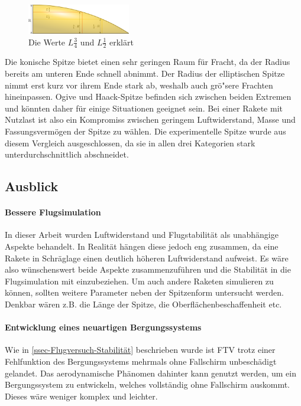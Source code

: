 \documentclass[10pt,a4paper]{article}
\begin{document}
\begin{figure}[h]
	\centering
	\includegraphics[width=0.4\textwidth]{Bilder/Frachtraum-Vergleich.png}
	\caption{Die Werte $L \tfrac{3}{4}$ und $L \tfrac{1}{2}$ erklärt}
\end{figure}

Die konische Spitze bietet einen sehr geringen Raum für Fracht, da der Radius bereits am unteren Ende schnell abnimmt. Der Radius der elliptischen Spitze nimmt erst kurz vor ihrem Ende stark ab, weshalb auch grö"sere Frachten hineinpassen. Ogive und Haack-Spitze befinden sich zwischen beiden Extremen und könnten daher für einige Situationen geeignet sein. Bei einer Rakete mit Nutzlast ist also ein Kompromiss zwischen geringem Luftwiderstand, Masse und Fassungsvermögen der Spitze zu wählen. Die experimentelle Spitze wurde aus diesem Vergleich ausgeschlossen, da sie in allen drei Kategorien stark unterdurchschnittlich abschneidet.

\subsection{Ausblick}

\paragraph{Bessere Flugsimulation}
In dieser Arbeit wurden Luftwiderstand und Flugstabilität als unabhängige Aspekte behandelt. In Realität hängen diese jedoch eng zusammen, da eine Rakete in Schräglage einen deutlich höheren Luftwiderstand aufweist. Es wäre also wünschenswert beide Aspekte zusammenzuführen und die Stabilität in die Flugsimulation mit einzubeziehen. Um auch andere Raketen simulieren zu können, sollten weitere Parameter neben der Spitzenform untersucht werden. Denkbar wären z.B. die Länge der Spitze, die Oberflächenbeschaffenheit etc.

\paragraph{Entwicklung eines neuartigen Bergungssystems}
Wie in \ref{ssec-Flugversuch-Stabilität} beschrieben wurde ist FTV trotz einer Fehlfunktion des Bergungssystems mehrmals ohne Fallschirm unbeschädigt gelandet. Das aerodynamische Phänomen dahinter kann genutzt werden, um ein Bergungssystem zu entwickeln, welches vollständig ohne Fallschirm auskommt. Dieses wäre weniger komplex und leichter. 
\end{document}
